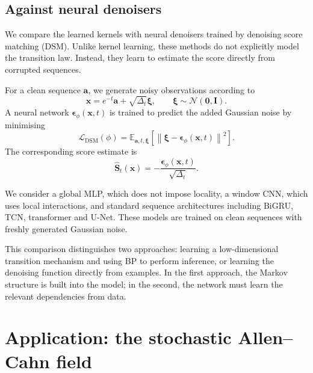 \documentclass{article}
\begin{document}
\subsection{Against neural denoisers}
\label{sec:neural-denoisers}

We compare the learned kernels with neural denoisers
trained by denoising score matching (DSM). Unlike
kernel learning, these methods do not explicitly
model the transition law. Instead, they learn to
estimate the score directly from corrupted sequences.

For a clean sequence $\mathbf{a}$, we generate noisy
observations according to
\begin{equation}
    \mathbf{x}
    =
    e^{-t}\mathbf{a}
    +
    \sqrt{\Delta_t}\boldsymbol{\xi},
    \qquad
    \boldsymbol{\xi}
    \sim
    \mathcal{N}(\mathbf{0},\mathbf{I}).
\end{equation}
A neural network
$\boldsymbol{\epsilon}_\phi(\mathbf{x},t)$ is trained
to predict the added Gaussian noise by minimising
\begin{equation}
    \mathcal{L}_{\mathrm{DSM}}(\phi)
    =
    \mathbb{E}_{\mathbf{a},t,\boldsymbol{\xi}}
    \left[
        \left\|
            \boldsymbol{\xi}
            -
            \boldsymbol{\epsilon}_\phi
            (\mathbf{x},t)
        \right\|^2
    \right].
    \label{eq:dsm-objective}
\end{equation}
The corresponding score estimate is
\begin{equation}
    \widehat{\mathbf{S}}_t(\mathbf{x})
    =
    -\frac{
        \boldsymbol{\epsilon}_\phi(\mathbf{x},t)
    }{
        \sqrt{\Delta_t}
    }.
\end{equation}

We consider a global MLP, which does not impose
locality, a window CNN, which uses local interactions,
and standard sequence architectures including
BiGRU, TCN, transformer and U-Net. These models are
trained on clean sequences with freshly generated
Gaussian noise.

This comparison distinguishes two approaches:
learning a low-dimensional transition mechanism and
using BP to perform inference, or learning the
denoising function directly from examples. In the
first approach, the Markov structure is built into
the model; in the second, the network must learn the
relevant dependencies from data.
\section{Application: the stochastic Allen--Cahn field}
\label{sec:allen-cahn}
\end{document}

